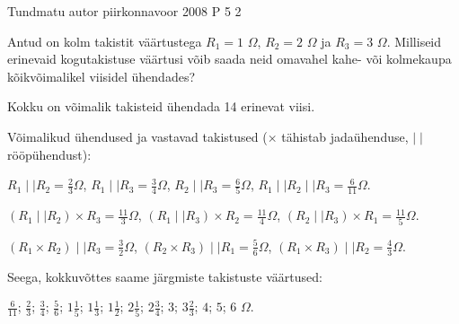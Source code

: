 {Tundmatu autor} %
{piirkonnavoor} %
{2008} %
{P 5} %
{2} %
{

\ifStatement
Antud on kolm takistit väärtustega $R_1 = 1$ $\Omega$, $R_2 = 2$ $\Omega$ ja $R_3 = 3$ $\Omega$. Milliseid erinevaid kogutakistuse väärtusi võib saada neid omavahel kahe- või kolmekaupa kõikvõimalikel viisidel ühendades?
\fi

\ifHint
Kokku on võimalik takisteid ühendada 14 erinevat viisi.
\fi

\ifSolution
Võimalikud ühendused ja vastavad takistused ($\times$ tähistab jadaühenduse, $\mid \mid$ rööpühendust):
\begin{center}
$R_1 \mid\mid R_2 = \frac{2}{3} \Omega$,
$R_1 \mid\mid R_3 = \frac{3}{4} \Omega$,
$R_2 \mid\mid R_3 = \frac{6}{5} \Omega$,
$R_1 \mid\mid R_2 \mid\mid R_3 = \frac{6}{11} \Omega$.
\end{center}

\begin{center}
$(R_1 \mid\mid R_2) \times R_3 = \frac{11}{3} \Omega$,
$(R_1 \mid\mid R_3) \times R_2 = \frac{11}{4} \Omega$,
$(R_2 \mid\mid R_3) \times R_1 = \frac{11}{5} \Omega$.
\end{center}

\begin{center}
$(R_1 \times R_2) \mid\mid R_3 = \frac{3}{2} \Omega$,
$(R_2 \times R_3) \mid\mid R_1 = \frac{5}{6} \Omega$,
$(R_1 \times R_3) \mid\mid R_2 = \frac{4}{3} \Omega$.
\end{center}

Seega, kokkuvõttes saame järgmiste takistuste väärtused:
\begin{center}
$\frac{6}{11}$;
$\frac{2}{3}$;
$\frac{3}{4}$;
$\frac{5}{6}$;
$1\frac{1}{5}$;
$1\frac{1}{3}$;
$1\frac{1}{2}$;
$2\frac{1}{5}$;
$2\frac{3}{4}$;
$3$;
$3\frac{2}{3}$;
$4$;
$5$;
$6$
$\Omega$.
\end{center}
\fi
}